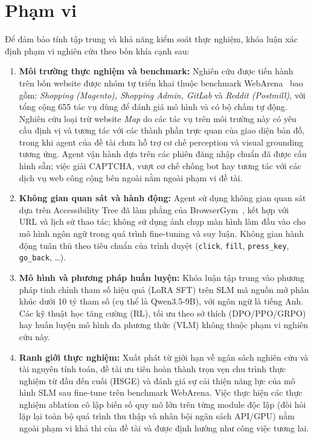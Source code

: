 \section{Phạm vi}
\label{sec:intro-scope}

Để đảm bảo tính tập trung và khả năng kiểm soát thực nghiệm, khóa luận xác định phạm vi nghiên cứu theo bốn khía cạnh sau:

\begin{enumerate}
  \item \textbf{Môi trường thực nghiệm và benchmark:} Nghiên cứu được tiến hành trên bốn website được nhóm tự triển khai thuộc benchmark WebArena~\cite{zhou2024webarena} bao gồm: \emph{Shopping (Magento), Shopping Admin, GitLab} và \emph{Reddit (Postmill)}, với tổng cộng 655 tác vụ dùng để đánh giá mô hình và có bộ chấm tự động. Nghiên cứu loại trừ website \emph{Map} do các tác vụ trên môi trường này có yêu cầu định vị và tương tác với các thành phần trực quan của giao diện bản đồ, trong khi agent của đề tài chưa hỗ trợ cơ chế perception và visual grounding tương ứng. Agent vận hành dựa trên các phiên đăng nhập chuẩn đã được cấu hình sẵn; việc giải CAPTCHA, vượt cơ chế chống bot hay tương tác với các dịch vụ web công cộng bên ngoài nằm ngoài phạm vi đề tài.
  \item \textbf{Không gian quan sát và hành động:} Agent sử dụng không gian quan sát dựa trên Accessibility Tree đã làm phẳng của BrowserGym~\cite{dechezelles2025browsergym}, kết hợp với URL và lịch sử thao tác; không sử dụng ảnh chụp màn hình làm đầu vào cho mô hình ngôn ngữ trong quá trình fine-tuning và suy luận. Không gian hành động tuân thủ theo tiêu chuẩn của trình duyệt (\texttt{click}, \texttt{fill}, \texttt{press\_key}, \texttt{go\_back}, \dots).
  \item \textbf{Mô hình và phương pháp huấn luyện:} Khóa luận tập trung vào phương pháp tinh chỉnh tham số hiệu quả (LoRA SFT) trên SLM mã nguồn mở phân khúc dưới 10 tỷ tham số (cụ thể là Qwen3.5-9B), với ngôn ngữ là tiếng Anh. Các kỹ thuật học tăng cường (RL), tối ưu theo sở thích (DPO/PPO/GRPO) hay huấn luyện mô hình đa phương thức (VLM) không thuộc phạm vi nghiên cứu này.
  \item \textbf{Ranh giới thực nghiệm:} Xuất phát từ giới hạn về ngân sách nghiên cứu và tài nguyên tính toán, đề tài ưu tiên hoàn thành trọn vẹn chu trình thực nghiệm từ đầu đến cuối (HSGE) và đánh giá sự cải thiện năng lực của mô hình SLM sau fine-tune trên benchmark WebArena. Việc thực hiện các thực nghiệm ablation cô lập biến số quy mô lớn trên từng module độc lập (đòi hỏi lặp lại toàn bộ quá trình thu thập và nhân bội ngân sách API/GPU) nằm ngoài phạm vi khả thi của đề tài và được định hướng như công việc tương lai.
\end{enumerate}

